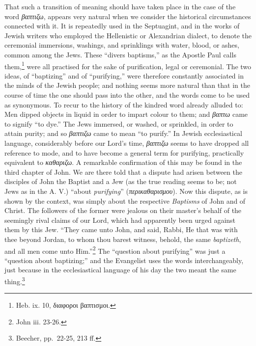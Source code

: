 \documentclass[english,]{book}
\begin{document}
That such a transition of meaning should have taken place in the case of the word \emph{βαπτιζω}, appears very natural when we consider the historical circumstances connected with it. It is repeatedly used in the Septuagint, and in the works of Jewish writers who employed the Hellenistic or Alexandrian dialect, to denote the ceremonial immersions, washings, and sprinklings with water, blood, or ashes, common among the Jews. These ``divers baptisms,'' as the Apostle Paul calls them,\footnote{Heb. ix. 10, διαφοροι βαπτισμοι.} were all practised for the sake of purification, legal or ceremonial. The two ideas, of ``baptizing'' and of ``purifying,'' were therefore constantly associated in the minds of the Jewish people; and nothing seems more natural than that in the course of time the one should pass into the other, and the words come to be used as synonymous. To recur to the history of the kindred word already alluded to: Men dipped objects in liquid in order to impart colour to them; and \emph{βαπτω} came to signify ``to dye.'' The Jews immersed, or washed, or sprinkled, in order to attain purity; and so \emph{βαπτιζω} came to mean ``to purify.'' In Jewish ecclesiastical language, considerably before our Lord's time, \emph{βαπτιζω} seems to have dropped all reference to mode, and to have become a general term for purifying, practically equivalent to \emph{καθαριζω}. A remarkable confirmation of this may be found in the third chapter of John. We are there told that a dispute had arisen between the disciples of John the Baptist and a Jew (as the true reading seems to be; not Jews as in the A. V.) ``about \emph{purifying}'' (\emph{περικαθαρισμου}). Now this dispute, as is shown by the context, was simply about the respective \emph{Baptisms} of John and of Christ. The followers of the former were jealous on their master's behalf of the seemingly rival claims of our Lord, which had apparently been urged against them by this Jew. ``They came unto John, and said, Rabbi, He that was with thee beyond Jordan, to whom thou barest witness, behold, the same \emph{baptizeth}, and all men come unto Him.''\footnote{John iii. 23-26.} The ``question about purifying'' was just a ``question about baptizing;'' and the Evangelist uses the words interchangeably, just because in the ecclesiastical language of his day the two meant the same thing.\footnote{Beecher, pp.~22-25, 213 ff.}
\end{document}
